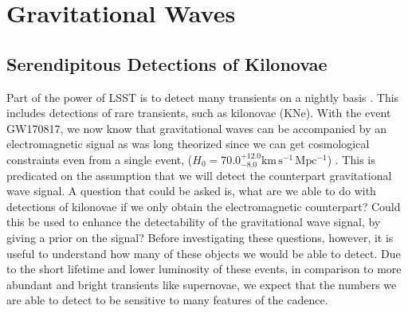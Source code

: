 
\newcommand{\md}{\mathrm{d}}

\section{Gravitational Waves}

\subsection{Serendipitous Detections of Kilonovae}
Part of the power of LSST is to detect many transients on a nightly basis \citep{LSSTScienceCollaboration2009}. This includes detections of rare transients, such as kilonovae (KNe). With the event GW170817, we now know that gravitational waves can be accompanied by an electromagnetic signal as was long theorized since we can get cosmological constraints even from a single event, ($H_0 = 70.0^{+12.0}_{-8.0} \mathrm{km\,s^{-1}\,Mpc^{-1}}$) \citep{Abbott2017}. This is predicated on the assumption that we will detect the counterpart gravitational wave signal. A question that could be asked is, what are we able to do with detections of kilonovae if we only obtain the electromagnetic counterpart? Could this be used to enhance the detectability of the
gravitational wave signal, by giving a prior on the signal? Before investigating these questions, however, it is useful to understand how many of these objects we would be able to detect. Due to the short lifetime and lower luminosity of these events, in comparison to more abundant and bright transients like supernovae, we expect that the numbers we are able to detect to be sensitive to many features of the cadence.\par

